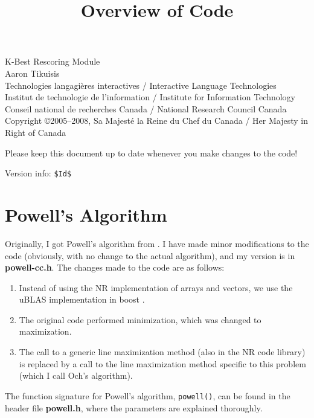 \documentclass[12pt]{amsart}
\newcommand{\file}{\textbf} \newcommand{\url}{\underline}
\newcommand{\code}[1]{{\small \texttt{#1}}}
\begin{document}
\title{Overview of Code} \maketitle

{\tiny
 \noindent K-Best Rescoring Module\\ Aaron Tikuisis\\
 Technologies langagi{\`e}res interactives / Interactive Language Technologies\\
 Institut de technologie de l'information / Institute for Information Technology\\
 Conseil national de recherches Canada / National Research Council Canada\\
 Copyright \copyright 2005--2008, Sa Majest{\'e} la Reine du Chef du Canada /
     Her Majesty in Right of Canada
}

\noindent
Please keep this document up to date whenever you make changes to the code!

{\tiny
\noindent
Version info: \verb+$Id$+
}
\\

\section*{Powell's Algorithm}

Originally, I got Powell's algorithm from \cite{NR-C++}.  I have made minor
modifications to the code (obviously, with no change to the actual algorithm),
and my version is in \file{powell-cc.h}.  The changes made to the code are
as follows:

\begin{enumerate}
\item Instead of using the NR implementation of arrays and vectors, we use the
      uBLAS implementation in boost \cite{uBLAS}.

\item The original code performed minimization, which was changed to
      maximization.

\item The call to a generic line maximization method (also in the NR code
      library) is replaced by a call to the line maximization method specific
      to this problem (which I call Och's algorithm).
\end{enumerate}

The function signature for Powell's algorithm, \code{powell()}, can be found in
the header file \file{powell.h}, where the parameters are explained thoroughly.
\end{document}

